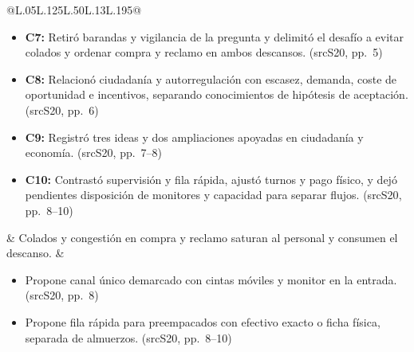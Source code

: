 \documentclass[11pt,a4paper]{article}
\makeatletter
\newcommand{\sourceurl}[2]{\hyper@linkurl{#2}{#1}}
\newcommand{\srclink}[1]{\begingroup\renewcommand{\sourceurl}[2]{\hyper@linkurl{#1}{##1}}\csname src#1\endcsname\endgroup}
\newlength{\usablewidth}
\newenvironment{compactitems}{\begin{minipage}[t]{\linewidth}\raggedright\begin{itemize}[label=\textbullet,leftmargin=1em,labelsep=.35em,nosep,topsep=0pt,partopsep=0pt,parsep=0pt]}{\end{itemize}\end{minipage}}
\newcommand{\evid}[2]{(\srclink{#1}, pp.~#2)}
\makeatother
\begin{document}
\begin{longtable}{@{}L{.05\usablewidth}L{.125\usablewidth}L{.50\usablewidth}L{.13\usablewidth}L{.195\usablewidth}@{}}
\begin{compactitems}
\item \textbf{C7:} Retiró barandas y vigilancia de la pregunta y delimitó el desafío a evitar colados y ordenar compra y reclamo en ambos descansos. \evid{S20}{5}
\item \textbf{C8:} Relacionó ciudadanía y autorregulación con escasez, demanda, coste de oportunidad e incentivos, separando conocimientos de hipótesis de aceptación. \evid{S20}{6}
\item \textbf{C9:} Registró tres ideas y dos ampliaciones apoyadas en ciudadanía y economía. \evid{S20}{7--8}
\item \textbf{C10:} Contrastó supervisión y fila rápida, ajustó turnos y pago físico, y dejó pendientes disposición de monitores y capacidad para separar flujos. \evid{S20}{8--10}
\end{compactitems} & Colados y congestión en compra y reclamo saturan al personal y consumen el descanso. & \begin{compactitems}
\item Propone canal único demarcado con cintas móviles y monitor en la entrada. \evid{S20}{8}
\item Propone fila rápida para preempacados con efectivo exacto o ficha física, separada de almuerzos. \evid{S20}{8--10}
\end{compactitems} \\
\end{longtable}
\end{document}
